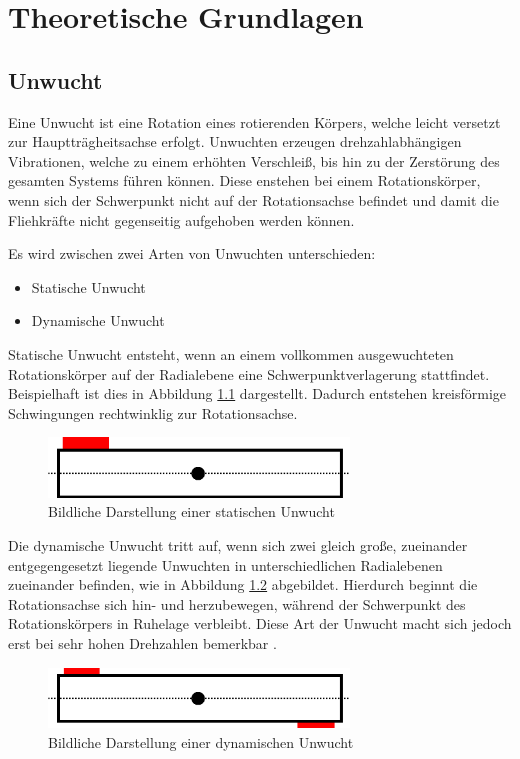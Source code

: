 
\chapter{Theoretische Grundlagen}

\section{Unwucht}
Eine Unwucht ist eine Rotation eines rotierenden Körpers, welche leicht versetzt zur Hauptträgheitsachse erfolgt.
Unwuchten erzeugen drehzahlabhängigen Vibrationen, welche zu einem erhöhten Verschleiß, bis hin zu der Zerstörung des gesamten Systems führen können.
Diese enstehen bei einem Rotationskörper, wenn sich der Schwerpunkt nicht auf der Rotationsachse befindet und damit die Fliehkräfte nicht gegenseitig aufgehoben werden können. \cite{unwucht_wiki:2011}

Es wird zwischen zwei Arten von Unwuchten unterschieden:
\begin{itemize}
    \item Statische Unwucht
    \item Dynamische Unwucht
\end{itemize}

Statische Unwucht entsteht, wenn an einem vollkommen ausgewuchteten Rotationskörper auf der Radialebene eine Schwerpunktverlagerung stattfindet. Beispielhaft ist dies in Abbildung \ref{fig:static_imbalance} dargestellt.
Dadurch entstehen kreisförmige Schwingungen rechtwinklig zur Rotationsachse.
\begin{figure}[H]
    \centering
    \includegraphics[width=8cm]{images/chapter/02/static_imbalance.png}
    \caption{Bildliche Darstellung einer statischen Unwucht}
    \label{fig:static_imbalance}
\end{figure}

Die dynamische Unwucht tritt auf, wenn sich zwei gleich große, zueinander entgegengesetzt liegende Unwuchten in unterschiedlichen Radialebenen zueinander befinden, wie in Abbildung \ref{fig:dynamic_imbalance} abgebildet.
Hierdurch beginnt die Rotationsachse sich hin- und herzubewegen, während der Schwerpunkt des Rotationskörpers in Ruhelage verbleibt.
Diese Art der Unwucht macht sich jedoch erst bei sehr hohen Drehzahlen bemerkbar \cite[S. 8]{vibromatrix:2007}.
\begin{figure}[H]
    \centering
    \includegraphics[width=8cm]{images/chapter/02/dynamic_imbalance.png}
    \caption{Bildliche Darstellung einer dynamischen Unwucht}
    \label{fig:dynamic_imbalance}
\end{figure}

